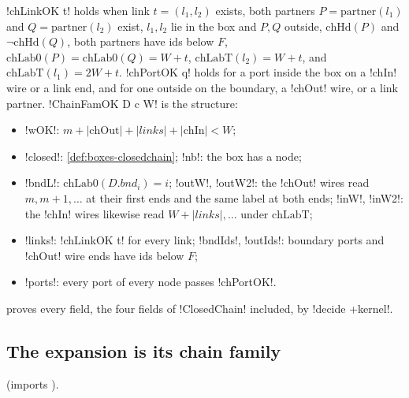 {\begin{definition}\label{def:boxes-chainFamOK}
\lbx!chLinkOK t! holds when link $t=(l_1,l_2)$ exists, both partners $P=\mathrm{partner}(l_1)$ and $Q=\mathrm{partner}(l_2)$ exist, $l_1,l_2$ lie in the box and $P,Q$ outside, $\mathrm{chHd}(P)$ and $\lnot\mathrm{chHd}(Q)$, both partners have ids below $F$, $\mathrm{chLab0}(P)=\mathrm{chLab0}(Q)=W+t$, $\mathrm{chLabT}(l_2)=W+t$, and $\mathrm{chLabT}(l_1)=2W+t$. \lbx!chPortOK q! holds for a port inside the box on a \lbx!chIn! wire or a link end, and for one outside on the boundary, a \lbx!chOut! wire, or a link partner. \lbx!ChainFamOK D c W! is the structure:
\begin{itemize}
\item \lbx!wOK!: $m+|\mathrm{chOut}|+|\mathit{links}|+|\mathrm{chIn}|<W$;
\item \lbx!closed!: \cref{def:boxes-closedchain}; \lbx!nb!: the box has a node;
\item \lbx!bndL!: $\mathrm{chLab0}(D.\mathit{bnd}_i)=i$; \lbx!outW!, \lbx!outW2!: the \lbx!chOut! wires read $m,m+1,\ldots$ at their first ends and the same label at both ends; \lbx!inW!, \lbx!inW2!: the \lbx!chIn! wires likewise read $W+|\mathit{links}|,\ldots$ under $\mathrm{chLabT}$;
\item \lbx!links!: \lbx!chLinkOK t! for every link; \lbx!bndIds!, \lbx!outIds!: boundary ports and \lbx!chOut! wire ends have ids below $F$;
\item \lbx!ports!: every port of every node passes \lbx!chPortOK!.
\end{itemize}
 proves every field, the four fields of \lbx!ClosedChain! included, by \lbx!decide +kernel!.
\end{definition}

\subsection{The expansion is its chain family}

 (imports ).

}
